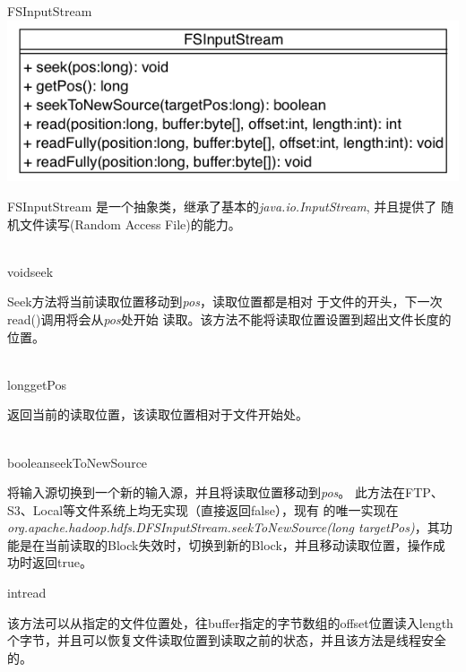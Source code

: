 \begin{XeClass}{FSInputStream}
\includegraphics[width=\textwidth]{cdig/FSInputStream.png}
     
 FSInputStream 是一个抽象类，继承了基本的\emph{java.io.InputStream}, 并且提供了
 随机文件读写(Random Access File)的能力。

    \begin{XeMethod}{\XePublic \\ \XeAbstract}{void}{seek}
         
 Seek方法将当前读取位置移动到\emph{pos}，读取位置都是相对
 于文件的开头，下一次read()调用将会从\emph{pos}处开始
 读取。该方法不能将读取位置设置到超出文件长度的位置。

    \end{XeMethod}

    \begin{XeMethod}{\XePublic \\ \XeAbstract}{long}{getPos}
         
 返回当前的读取位置，该读取位置相对于文件开始处。

    \end{XeMethod}

    \begin{XeMethod}{\XePublic \\ \XeAbstract}{boolean}{seekToNewSource}
         
 将输入源切换到一个新的输入源，并且将读取位置移动到\emph{pos}。
 此方法在FTP、S3、Local等文件系统上均无实现（直接返回false），现有
 的唯一实现在\emph{org.apache.hadoop.hdfs.DFSInputStream.seekToNewSource(long targetPos)}，其功能是在当前读取的Block失效时，切换到新的Block，并且移动读取位置，操作成
 功时返回true。

    \end{XeMethod}

    \begin{XeMethod}{\XePublic}{int}{read}
         
 该方法可以从指定的文件位置处，往buffer指定的字节数组的offset位置读入length
 个字节，并且可以恢复文件读取位置到读取之前的状态，并且该方法是线程安全的。


\end{XeMethod}
\end{XeClass}
